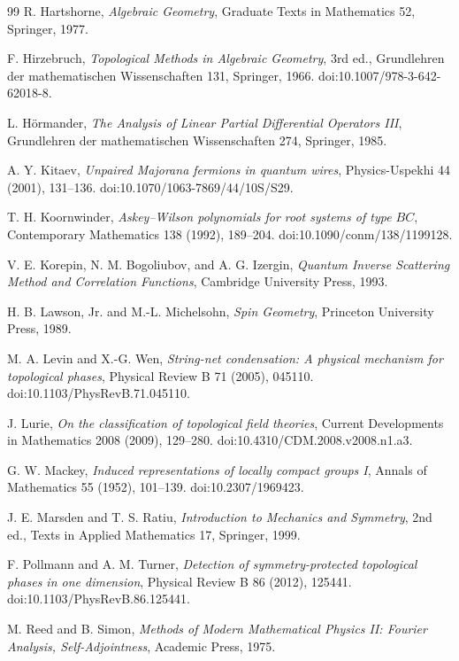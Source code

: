 \documentclass[11pt]{article}
\theoremstyle{definition}
\begin{document}
\begin{thebibliography}{99}
R. Hartshorne,
\emph{Algebraic Geometry},
Graduate Texts in Mathematics 52, Springer, 1977.

F. Hirzebruch,
\emph{Topological Methods in Algebraic Geometry}, 3rd ed.,
Grundlehren der mathematischen Wissenschaften 131, Springer, 1966.
doi:10.1007/978-3-642-62018-8.

L. H\"ormander,
\emph{The Analysis of Linear Partial Differential Operators III},
Grundlehren der mathematischen Wissenschaften 274, Springer, 1985.

A. Y. Kitaev,
\emph{Unpaired Majorana fermions in quantum wires},
Physics-Uspekhi 44 (2001), 131--136.
doi:10.1070/1063-7869/44/10S/S29.

T. H. Koornwinder,
\emph{Askey--Wilson polynomials for root systems of type $BC$},
Contemporary Mathematics 138 (1992), 189--204.
doi:10.1090/conm/138/1199128.

V. E. Korepin, N. M. Bogoliubov, and A. G. Izergin,
\emph{Quantum Inverse Scattering Method and Correlation Functions},
Cambridge University Press, 1993.

H. B. Lawson, Jr. and M.-L. Michelsohn,
\emph{Spin Geometry},
Princeton University Press, 1989.

M. A. Levin and X.-G. Wen,
\emph{String-net condensation: A physical mechanism for topological
phases},
Physical Review B 71 (2005), 045110.
doi:10.1103/PhysRevB.71.045110.

J. Lurie,
\emph{On the classification of topological field theories},
Current Developments in Mathematics 2008 (2009), 129--280.
doi:10.4310/CDM.2008.v2008.n1.a3.

G. W. Mackey,
\emph{Induced representations of locally compact groups I},
Annals of Mathematics 55 (1952), 101--139.
doi:10.2307/1969423.

J. E. Marsden and T. S. Ratiu,
\emph{Introduction to Mechanics and Symmetry}, 2nd ed.,
Texts in Applied Mathematics 17, Springer, 1999.

F. Pollmann and A. M. Turner,
\emph{Detection of symmetry-protected topological phases in one dimension},
Physical Review B 86 (2012), 125441.
doi:10.1103/PhysRevB.86.125441.

M. Reed and B. Simon,
\emph{Methods of Modern Mathematical Physics II: Fourier Analysis,
Self-Adjointness},
Academic Press, 1975.


\end{thebibliography}
\end{document}
